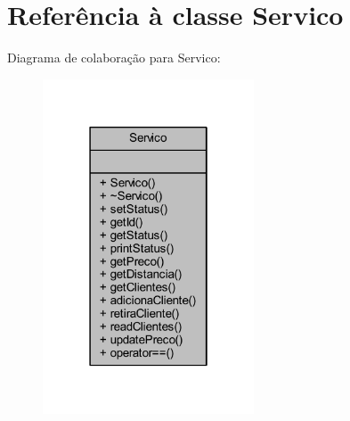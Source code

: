 \hypertarget{class_servico}{}\section{Referência à classe Servico}
\label{class_servico}


Diagrama de colaboração para Servico\+:
\nopagebreak
\begin{figure}[H]
\begin{center}
\leavevmode
\includegraphics[width=178pt]{class_servico__coll__graph}
\end{center}
\end{figure}
